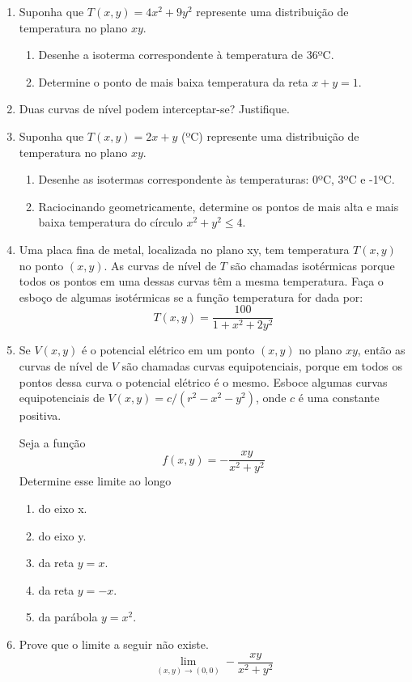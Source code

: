 \documentclass[11pt,a4paper]{article}
\newcommand{\limite}{\displaystyle\lim}
\begin{document}
\begin{enumerate}
		\item Suponha que $T(x,y) = 4x^2 + 9y^2$ represente uma distribuição de temperatura no plano $xy$.
			\begin{enumerate}
				\item Desenhe a isoterma correspondente à temperatura de 36ºC.
				\item Determine o ponto de mais baixa temperatura da reta $x + y = 1$.
			\end{enumerate}	
		\item Duas curvas de nível podem interceptar-se? Justifique.
		\item Suponha que $T(x,y) = 2x + y$ (ºC) represente uma distribuição de temperatura no plano $xy$.	
			\begin{enumerate}
				\item Desenhe as isotermas correspondente às temperaturas: 0ºC, 3ºC e -1ºC.
				\item Raciocinando geometricamente, determine os pontos de mais alta e mais baixa temperatura do círculo $x^2 + y^2 \leq 4 $.
			\end{enumerate}	
		\item Uma placa fina de metal, localizada no plano xy, tem temperatura $T(x,y)$ no ponto $(x,y)$. As curvas de nível de $T$ são chamadas isotérmicas porque todos os pontos em uma dessas curvas têm a mesma temperatura. Faça o esboço de algumas isotérmicas se a função temperatura for dada por:
		$$T(x,y) = \displaystyle\frac{100}{1 + x^2 + 2y^2} $$	
		\item Se $V(x,y)$ é o potencial elétrico em um ponto $(x,y)$ no plano $xy$, então as curvas de nível de $V$ são chamadas curvas equipotenciais, porque em todos os pontos dessa curva o potencial elétrico é o mesmo. Esboce algumas curvas equipotenciais de $V(x,y) = c / (r^2 - x^2 - y^2)$, onde $c$ é uma constante positiva.
		
		 Seja a função
		$$f(x,y) = - \displaystyle\frac{xy}{x^2 + y^2} $$
		Determine esse limite ao longo
	\begin{enumerate}
		\item do eixo x.
		\item do eixo y.
		\item da reta $y = x$.		
		\item da reta $y = -x$.
		\item da parábola $y = x^2$.
	\end{enumerate}
	
	\item Prove que o limite a seguir não existe.
	$$\limite_{(x,y) \to (0,0)} - \displaystyle\frac{xy}{x^2 + y^2}$$
	

\end{enumerate}
\end{document}
